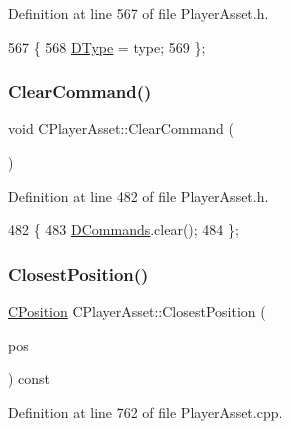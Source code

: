 Definition at line 567 of file Player\+Asset.\+h.


\begin{DoxyCode}
567                                                                \{
568             \hyperlink{classCPlayerAsset_a5d61f73471e1e6f0a6ab15f2ffa7b359}{DType} = type;
569         \};
\end{DoxyCode}
\hypertarget{classCPlayerAsset_ad4b1ea5ddba1c2b5dbee5ee5015e193b}{}\label{classCPlayerAsset_ad4b1ea5ddba1c2b5dbee5ee5015e193b} 
\subsubsection{\texorpdfstring{Clear\+Command()}{ClearCommand()}}
{\footnotesize\ttfamily void C\+Player\+Asset\+::\+Clear\+Command (\begin{DoxyParamCaption}{ }\end{DoxyParamCaption})\hspace{0.3cm}{\ttfamily [inline]}}



Definition at line 482 of file Player\+Asset.\+h.


\begin{DoxyCode}
482                            \{
483             \hyperlink{classCPlayerAsset_a4d3b96106d3b1c1020f98005884d2a87}{DCommands}.clear();  
484         \};
\end{DoxyCode}
\hypertarget{classCPlayerAsset_a67e700ce77122894c02da584dd652767}{}\label{classCPlayerAsset_a67e700ce77122894c02da584dd652767} 
\subsubsection{\texorpdfstring{Closest\+Position()}{ClosestPosition()}}
{\footnotesize\ttfamily \hyperlink{classCPosition}{C\+Position} C\+Player\+Asset\+::\+Closest\+Position (\begin{DoxyParamCaption}\item[{const \hyperlink{classCPosition}{C\+Position} \&}]{pos }\end{DoxyParamCaption}) const}



Definition at line 762 of file Player\+Asset.\+cpp.


